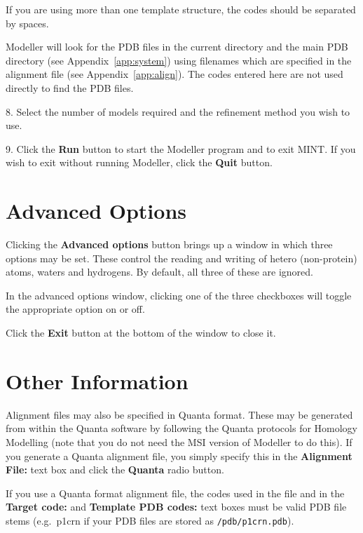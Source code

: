 \documentclass[12pt]{article}
\begin{document}
If you are using more than one template structure, the codes
should be separated by spaces.

Modeller will look for the PDB files in the current directory and the
main PDB directory (see Appendix~\ref{app:system}) using filenames
which are specified in the alignment file (see
Appendix~\ref{app:align}). The codes entered here are not used
directly to find the PDB files.

8. Select the number of models required and the refinement method you
wish to use.

9. Click the {\bfseries Run} button to start the Modeller program and to exit
MINT. If you wish to exit without running Modeller, click the {\bfseries Quit}
button. 




\section{Advanced Options}
Clicking the {\bfseries Advanced options} button brings up a window in
which three options may be set. These control the reading and writing
of hetero (non-protein) atoms, waters and hydrogens. By default, all
three of these are ignored.

In the advanced options window, clicking one of the three checkboxes
will toggle the appropriate option on or off.

Click the {\bfseries Exit} button at the bottom of the window to close
it.



\section{Other Information}

Alignment files may also be specified in Quanta format. These may be
generated from within the Quanta software by following the Quanta
protocols for Homology Modelling (note that you do not need the MSI
version of Modeller to do this). If you generate a Quanta alignment
file, you simply specify this in the {\bfseries Alignment File:} text
box and click the {\bfseries Quanta} radio button.

If you use a Quanta format alignment file, the codes used in the file
and in the {\bfseries Target code:} and {\bfseries Template PDB
codes:} text boxes must be valid PDB file stems (e.g.\ p1crn if your
PDB files are stored as {\tt /pdb/p1crn.pdb}).
\end{document}
